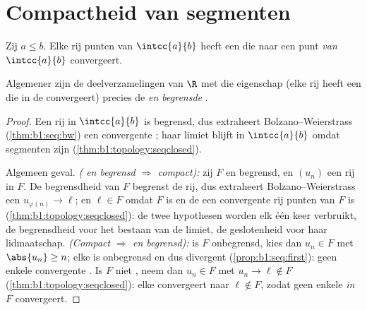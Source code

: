 \section{Compactheid van segmenten}

\begin{theorem}\label{thm:b1:topology:compact}
Zij $a \leq b$. Elke rij punten van $\intcc{a}{b}$ heeft een  die
naar een punt \emph{van} $\intcc{a}{b}$
convergeert.

Algemener zijn de deelverzamelingen van $\R$ met die eigenschap (elke rij
heeft een  die in de  convergeert) precies de
\emph{ en begrensde} .
\end{theorem}

\begin{proof}
Een rij in $\intcc{a}{b}$ is begrensd, dus extraheert
Bolzano--Weierstrass (\cref{thm:b1:seq:bw}) een convergente ; haar
limiet blijft in $\intcc{a}{b}$ omdat segmenten  zijn
(\cref{thm:b1:topology:seqclosed}).

Algemeen geval. \emph{( en begrensd $\Rightarrow$ compact):} zij
$F$  en begrensd, en $(u_n)$ een rij in $F$. De begrensdheid van
$F$ begrenst de rij, dus extraheert Bolzano--Weierstrass een
$u_{\varphi(n)} \to \ell$; en $\ell \in F$ omdat $F$  is en de
 een convergente rij punten van $F$ is
(\cref{thm:b1:topology:seqclosed}): de twee hypothesen worden elk één
keer verbruikt, de begrensdheid voor het bestaan van de limiet, de
geslotenheid voor haar lidmaatschap. \emph{(Compact $\Rightarrow$
 en begrensd):} is $F$ onbegrensd, kies dan $u_n \in F$ met
$\abs{u_n} \geq n$; elke  is onbegrensd en dus divergent
(\cref{prop:b1:seq:first}): geen enkele convergente . Is $F$ niet
, neem dan $u_n \in F$ met $u_n \to \ell \notin F$
(\cref{thm:b1:topology:seqclosed}): elke  convergeert naar $\ell
\notin F$, zodat geen enkele  \emph{in} $F$ convergeert.
\end{proof}

